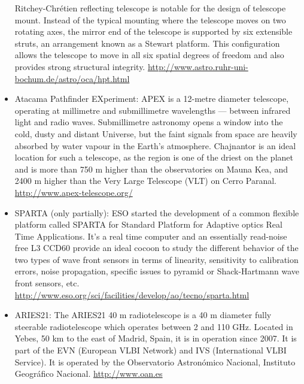 \begin{itemize}
		Ritchey-Chrétien reflecting telescope is notable for the design of telescope mount. Instead of the typical mounting where the telescope moves on two 
		rotating axes, the mirror end of the telescope is supported by six extensible struts, an arrangement known as a Stewart platform. This configuration 
		allows the telescope to move in all six spatial degrees of freedom and also provides strong structural integrity.
		\url{http://www.astro.ruhr-uni-bochum.de/astro/oca/hpt.html}
	\item Atacama Pathfinder EXperiment: APEX is a 12-metre diameter telescope, operating at millimetre and submillimetre wavelengths — between infrared light and 
		radio waves. Submillimetre astronomy opens a window into the cold, dusty and distant Universe, but the faint signals from space are heavily absorbed 
		by water vapour in the Earth's atmosphere. Chajnantor is an ideal location for such a telescope, as the region is one of the driest on the planet and 
		is more than 750 m higher than the observatories on Mauna Kea, and 2400 m higher than the Very Large Telescope (VLT) on Cerro Paranal. 
		\url{http://www.apex-telescope.org/}
	\item SPARTA (only partially): ESO started the development of a common flexible platform called SPARTA for Standard Platform for Adaptive optics Real Time 
		Applications. It's a real time computer and an essentially read-noise free L3 CCD60 provide an ideal cocoon to study the different behavior of the 
		two types of wave front sensors in terms of linearity, sensitivity to calibration errors, noise propagation, specific issues to pyramid or 
		Shack-Hartmann wave front sensors, etc. 
		\url{http://www.eso.org/sci/facilities/develop/ao/tecno/sparta.html}
	\item ARIES21: The ARIES21 40 m radiotelescope is a 40 m diameter fully steerable radiotelescope which operates between 2 and 110 GHz. Located 
		in Yebes, 50 km to the east of Madrid, Spain, it is in operation since 2007. It is part of the EVN (European VLBI Network) and IVS 
		(International VLBI Service). It is operated by the Observatorio Astronómico Nacional, Instituto Geográfico Nacional.
		\url{http://www.oan.es}
\end{itemize}
